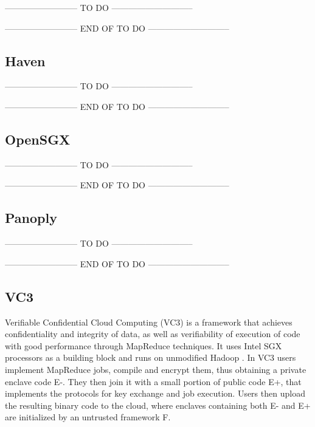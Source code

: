-------------------------- TO DO -----------------------------



-------------------------- END OF TO DO -----------------------------

\subsection{Haven}

-------------------------- TO DO -----------------------------



-------------------------- END OF TO DO -----------------------------

\subsection{OpenSGX}

-------------------------- TO DO -----------------------------



-------------------------- END OF TO DO -----------------------------

\subsection{Panoply}

-------------------------- TO DO -----------------------------



-------------------------- END OF TO DO -----------------------------

\subsection{VC3}
\label{ssec:vc3_mapreduce}

Verifiable Confidential Cloud Computing (VC3) \cite{vc3Paper} is a framework that achieves confidentiality and integrity of data, as well as verifiability of execution of code with good performance through MapReduce \cite{mapReduce} techniques. It uses Intel SGX processors as a building block and runs on unmodified Hadoop \cite{hadoop}.
In VC3 users implement MapReduce jobs, compile and encrypt them, thus obtaining a private enclave code E-. They then join it with a small portion of public code E+, that implements the protocols for key exchange and job execution.
Users then upload the resulting binary code to the cloud, where enclaves containing both E- and E+ are initialized by an untrusted framework F. 

